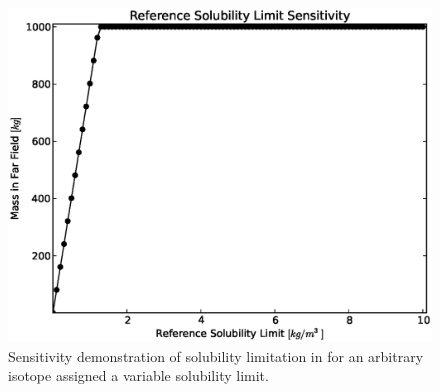 
\begin{figure}[htbp!]
\begin{center}
\includegraphics[width=0.7\linewidth]{./sol.eps}
\caption[Solubility Sensitivity in the Mixed Cell Model]{Sensitivity demonstration of solubility limitation in \Cyder for an arbitrary isotope assigned a variable solubility limit.}
\label{fig:sol_result}
\end{center}
\end{figure}
